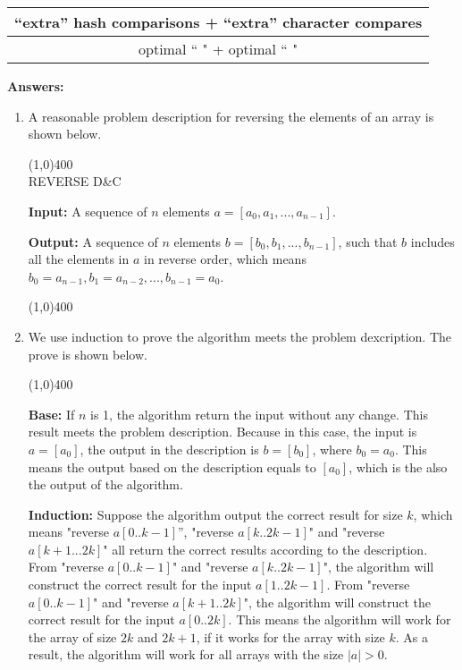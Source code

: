 \documentclass[11pt,letterpaper,oneside]{article}
\begin{document}
\begin{enumerate}
\begin{enumerate}
\begin{tabular}{c}
``extra'' hash comparisons + ``extra'' character compares\\ \hline
optimal ``      " + optimal ``         "\\
\end{tabular}

\end{enumerate}

\end{enumerate}


\noindent\textbf{Answers:}
\begin{enumerate}
\item A reasonable problem description for reversing the elements of an array is shown below.

\line(1,0){400}\\
    REVERSE D\&C

    \textbf{Input:} A sequence of $n$ elements $a = [a_{0}, a_{1}, ..., a_{n-1}]$.

    \textbf{Output:} A sequence of $n$ elements $b = [b_{0}, b_{1}, ..., b_{n-1}]$, such that $b$ includes all the elements in $a$ in reverse order, which means $b_{0}=a_{n-1}, b_{1}=a_{n-2}, ..., b_{n-1}=a_{0}$.

\vspace{-1em}\line(1,0){400}
\item We use induction to prove the algorithm meets the problem dexcription. The prove is shown below.

\line(1,0){400}

    \textbf{Base:} If $n$ is 1, the algorithm return the input without any change. This result meets the problem description. Because in this case, the input is $a = [a_{0}]$, the output in the description is $b = [b_{0}]$, where $b_{0}=a_{0}$. This means the output based on the description equals to $[a_{0}]$, which is the also the output of the algorithm.

    \textbf{Induction:} Suppose the algorithm output the correct result for size $k$, which means "reverse $a[0..k-1]$'', "reverse $a[k..2k-1]$" and "reverse $a[k+1...2k]$" all return the correct results according to the description. From "reverse $a[0..k-1]$" and "reverse $a[k..2k-1]$", the algorithm will construct the correct result for the input $a[1..2k-1]$. From "reverse $a[0..k-1]$" and "reverse $a[k+1..2k]$", the algorithm will construct the correct result for the input $a[0..2k]$. This means the algorithm will work for the array of size $2k$ and $2k+1$, if it works for the array with size $k$. As a result, the algorithm will work for all arrays with the size $|a|>0$.


\end{enumerate}
\end{document}
